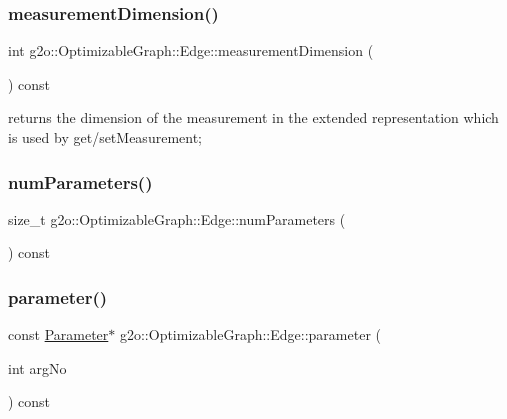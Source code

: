 \subsubsection{\texorpdfstring{measurement\+Dimension()}{measurementDimension()}}
{\footnotesize\ttfamily int g2o\+::\+Optimizable\+Graph\+::\+Edge\+::measurement\+Dimension (\begin{DoxyParamCaption}{ }\end{DoxyParamCaption}) const\hspace{0.3cm}{\ttfamily [virtual]}}

returns the dimension of the measurement in the extended representation which is used by get/set\+Measurement; \mbox{\label{classg2o_1_1_optimizable_graph_1_1_edge_ae7da26fd36246411bc53ca008bc24fcf}} 
\subsubsection{\texorpdfstring{num\+Parameters()}{numParameters()}}
{\footnotesize\ttfamily size\+\_\+t g2o\+::\+Optimizable\+Graph\+::\+Edge\+::num\+Parameters (\begin{DoxyParamCaption}{ }\end{DoxyParamCaption}) const\hspace{0.3cm}{\ttfamily [inline]}}

\mbox{\label{classg2o_1_1_optimizable_graph_1_1_edge_a4a224a1d0d0bc5ef70765f57ae685d09}} 
\subsubsection{\texorpdfstring{parameter()}{parameter()}}
{\footnotesize\ttfamily const \mbox{\hyperlink{classg2o_1_1_parameter}{Parameter}}$\ast$ g2o\+::\+Optimizable\+Graph\+::\+Edge\+::parameter (\begin{DoxyParamCaption}\item[{int}]{arg\+No }\end{DoxyParamCaption}) const\hspace{0.3cm}{\ttfamily [inline]}}

